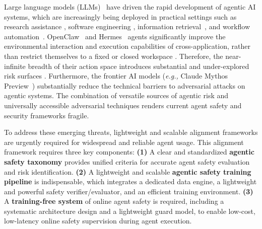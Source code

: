 \newcommand{\nosep}{\vspace{-4mm}}


\newcommand{\cmark}{{\color{OliveGreen}\ding{51}}}
\newcommand{\xmark}{{\color{BrickRed}\ding{55}}}

\newcommand{\yes}{{\color{OliveGreen}\ding{51}}}
\newcommand{\no}{{\color{BrickRed}\ding{55}}}


Large language models (LLMs)~\citep{openai_gpt54_2026, anthropic_claude_opus_46_2026, glm5team2026glm5, gemini3} have driven the rapid development of agentic AI systems, which are increasingly being deployed in practical settings such as research assistance \citep{zheng2025deepresearcher}, software engineering \citep{jimenez2023swe}, information retrieval~\citep{zhao2025tura}, and workflow automation~\citep{wang2024agentworkflowmemory}. OpenClaw~\citep{steinberger2026openclaw} and Hermes~\citep{nousresearch2026hermes} agents significantly improve the environmental interaction and execution capabilities of cross-application, rather than restrict themselves to a fixed or closed workspace \citep{verge_moltbot_2026, wired_moltbot_2026}. Therefore, the near-infinite breadth of their action space introduces substantial and under-explored risk surfaces \citep{kim2026attack, wang2025comprehensive}. Furthermore, the frontier AI models (\emph{e.g., }Claude Mythos Preview~\citep{Mythos_Preview}) substantially reduce the technical barriers to adversarial attacks on agentic systems. The combination of versatile sources of agentic risk and universally accessible adversarial techniques renders current agent safety and security frameworks fragile.


 To address these emerging threats, lightweight and scalable alignment frameworks are urgently required for widespread and reliable agent usage. This alignment framework requires three key components: \textbf{(1)} A clear and standardized \textbf{agentic safety taxonomy} provides unified criteria for accurate agent safety evaluation and risk identification. \textbf{(2)} A lightweight and scalable \textbf{agentic safety training pipeline} is indispensable, which integrates a dedicated data engine, a lightweight and powerful safety verifier/evaluator, and an efficient training environment. \textbf{(3)} A \textbf{training-free system} of online agent safety is required, including a systematic architecture design and a lightweight guard model, to enable low-cost, low-latency online safety supervision during agent execution. 
 

